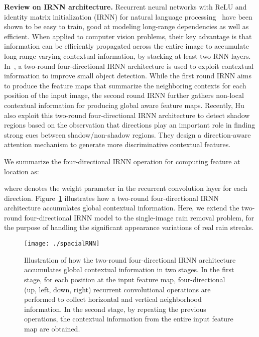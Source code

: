 \documentclass[10pt,twocolumn,letterpaper]{article}
\begin{document}
{\bf Review on IRNN architecture.} Recurrent neural networks with ReLU and identity matrix initialization (IRNN) for natural language processing~\cite{le:arxiv:2015:simple} have been shown to be easy to train, good at modeling long-range dependencies as well as efficient. When applied to computer vision problems, their key advantage is that information can be efficiently propagated across the entire image to accumulate long range varying contextual information, by stacking at least two RNN layers.
In~\cite{bell:cvpr:2016:ion}, a two-round four-directional IRNN architecture is used to exploit contextual information to improve small object detection. While the first round IRNN aims to produce the feature maps that summarize the neighboring contexts for each position of the input image, the second round IRNN further gathers non-local contextual information for producing global aware feature maps.
Recently, Hu~\etal~\cite{hu:cvpr:2018:dsc} also exploit this two-round four-directional IRNN architecture to detect shadow regions based on the observation that directions play an important role in finding strong cues between shadow/non-shadow regions. They design a direction-aware attention mechanism to generate more discriminative contextual features.

We summarize the four-directional IRNN operation for computing feature  at location  as:

where  denotes the weight parameter in the recurrent convolution layer for each direction. Figure~\ref{fig:GA} illustrates how a two-round four-directional IRNN architecture accumulates global contextual information.
Here, we extend the two-round four-directional IRNN model to the single-image rain removal problem, for the purpose of handling the significant appearance variations of real rain streaks.

\begin{figure}[t]
\centering
\texttt{[image: ./spacialRNN]}
\caption{Illustration of how the two-round four-directional IRNN architecture accumulates global contextual information in two stages. In the first stage, for each position at the input feature map, four-directional (up, left, down, right) recurrent convolutional operations are performed to collect horizontal and vertical neighborhood information. In the second stage, by repeating the previous operations, the contextual information from the entire input feature map are obtained.}
\label{fig:GA}
\vspace{-4mm}
\end{figure}
\end{document}
